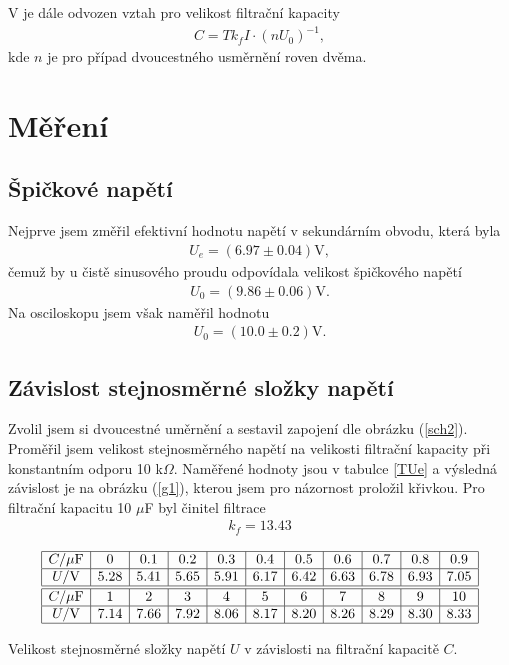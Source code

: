 \documentclass[a4paper,12pt]{article}
\begin{document}
V \cite{text} je dále odvozen vztah pro velikost filtrační kapacity
\begin{eqnarray}
C=Tk_fI\cdot(nU_0)^{-1},
\end{eqnarray}
kde $n$ je pro případ dvoucestného usměrnění roven dvěma.

\section{Měření}

\subsection{Špičkové napětí}
Nejprve jsem změřil efektivní hodnotu napětí v sekundárním obvodu, která byla 
\begin{eqnarray}
U_e=(6.97 \pm 0.04)\mbox{V}, 
\end{eqnarray}
čemuž by u čistě sinusového proudu odpovídala velikost špičkového napětí 
\begin{eqnarray}
U_0=(9.86 \pm 0.06)\mbox{V}. 
\end{eqnarray}
Na osciloskopu jsem však naměřil hodnotu 
\begin{eqnarray}
U_0=(10.0\pm0.2)\mbox{V}.
\end{eqnarray}

\subsection{Závislost stejnosměrné složky napětí}
Zvolil jsem si dvoucestné uměrnění a sestavil zapojení dle obrázku (\ref{sch2}). Proměřil jsem 
velikost stejnosměrného napětí na velikosti filtrační kapacity při konstantním 
odporu 10 k$\Omega$. Naměřené hodnoty jsou v tabulce \ref{TUe} a výsledná závislost 
je na obrázku (\ref{g1}), kterou jsem pro názornost proložil křivkou. Pro filtrační 
kapacitu 10 $\mu$F byl činitel filtrace
\begin{eqnarray}
k_f=13.43
\end{eqnarray}

\begin{table}
$$
\begin{array}{|c|c|c|c|c|c|c|c|c|c|c|}
\hline
C/\mu\mbox{F}&  0&  0.1&   0.2&   0.3&   0.4&   0.5&   0.6&   0.7&   0.8&   0.9 \\ \hline
U/\mbox{V}&   5.28&   5.41&   5.65&   5.91&   6.17&   6.42&   6.63&   6.78&   6.93&   7.05   \\ \hline \hline
C/\mu\mbox{F}&  1&   2&   3&   4&   5&   6&   7&   8&   9&   10 \\ \hline
U/\mbox{V}&   7.14&   7.66&   7.92&   8.06&   8.17&   8.20&   8.26&   8.29&   8.30&   8.33    \\ \hline
\end{array}
$$
\caption{Velikost stejnosměrné složky napětí $U$ v závislosti na filtrační kapacitě $C$.}
\label{TUe}
\end{table}
\end{document}
